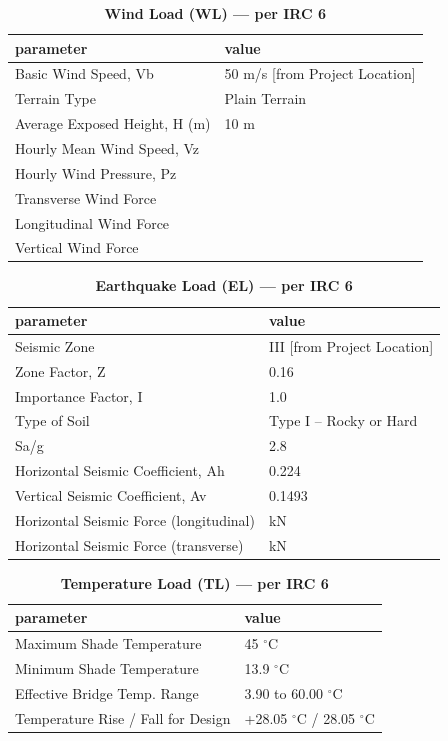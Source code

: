 \documentclass[12pt,a4paper]{report}
\numberwithin{table}{chapter}
\numberwithin{figure}{chapter}
\begin{document}
\vspace{1em}
\begin{longtable}{|L{5.5cm}|p{10.0cm}|}
\caption{\textbf{Wind Load (WL) --- per IRC 6}}
\hline
\textbf{parameter} & \textbf{value} \\
\hline
\textnormal{Basic Wind Speed, Vb} & 50 m/s [from Project Location] \\[6pt]
\hline
\textnormal{Terrain Type} & Plain Terrain \\[6pt]
\hline
\textnormal{Average Exposed Height, H (m)} & 10 m \\[6pt]
\hline
\textnormal{Hourly Mean Wind Speed, Vz} &  \\[6pt]
\hline
\textnormal{Hourly Wind Pressure, Pz} &  \\[6pt]
\hline
\textnormal{Transverse Wind Force} &  \\[6pt]
\hline
\textnormal{Longitudinal Wind Force} &  \\[6pt]
\hline
\textnormal{Vertical Wind Force} &  \\[6pt]
\hline
\end{longtable}

\vspace{1em}
\begin{longtable}{|L{5.5cm}|p{10.0cm}|}
\caption{\textbf{Earthquake Load (EL) --- per IRC 6}}
\hline
\textbf{parameter} & \textbf{value} \\
\hline
\textnormal{Seismic Zone} & III [from Project Location] \\[6pt]
\hline
\textnormal{Zone Factor, Z} & 0.16 \\[6pt]
\hline
\textnormal{Importance Factor, I} & 1.0 \\[6pt]
\hline
\textnormal{Type of Soil} & Type I – Rocky or Hard \\[6pt]
\hline
\textnormal{Sa/g} & 2.8 \\[6pt]
\hline
\textnormal{Horizontal Seismic Coefficient, Ah} & 0.224 \\[6pt]
\hline
\textnormal{Vertical Seismic Coefficient, Av} & 0.1493 \\[6pt]
\hline
\textnormal{Horizontal Seismic Force (longitudinal)} &  kN \\[6pt]
\hline
\textnormal{Horizontal Seismic Force (transverse)} &  kN \\[6pt]
\hline
\end{longtable}

\vspace{1em}
\begin{longtable}{|L{5.5cm}|p{10.0cm}|}
\caption{\textbf{Temperature Load (TL) --- per IRC 6}}
\hline
\textbf{parameter} & \textbf{value} \\
\hline
\textnormal{Maximum Shade Temperature} & 45 $^\circ$C \\[6pt]
\hline
\textnormal{Minimum Shade Temperature} & 13.9 $^\circ$C \\[6pt]
\hline
\textnormal{Effective Bridge Temp. Range} & 3.90 to 60.00 $^\circ$C \\[6pt]
\hline
\textnormal{Temperature Rise / Fall for Design} & +28.05 $^\circ$C / \textminus{}28.05 $^\circ$C \\[6pt]
\hline
\end{longtable}
\end{document}
